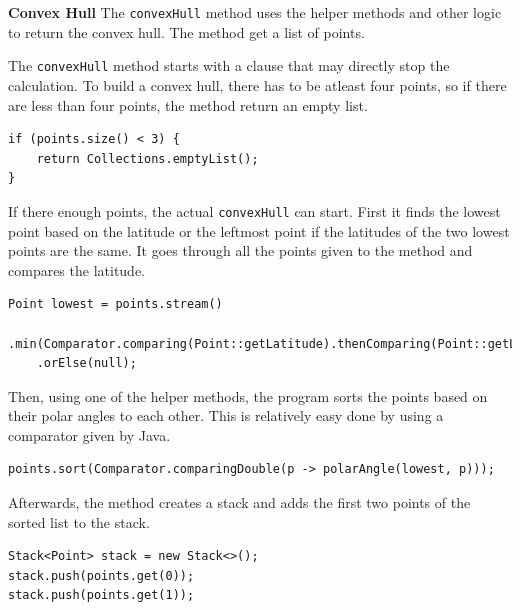     \textbf{Convex Hull}
    The \texttt{convexHull} method uses the helper methods and other logic to return the convex hull. The method get a list of points. \newline
    
    The \texttt{convexHull} method starts with a clause that may directly stop the calculation. To build a convex hull, there has to be atleast four points, so if there are less than four points, the method return an empty list.
    \lstset{style=mycsharp, caption=if Clause for Point Size}
    \begin{lstlisting}
if (points.size() < 3) {
    return Collections.emptyList();
}
    \end{lstlisting}
 
    If there enough points, the actual \texttt{convexHull} can start. First it finds the lowest point based on the latitude or the leftmost point if the latitudes of the two lowest points are the same. It goes through all the points given to the method and compares the latitude.
    \lstset{style=mycsharp, caption=Lowest Point Calculation}
    \begin{lstlisting}
Point lowest = points.stream()
    .min(Comparator.comparing(Point::getLatitude).thenComparing(Point::getLongitude))
    .orElse(null);
    \end{lstlisting}

    Then, using one of the helper methods, the program sorts the points based on their polar angles to each other. This is relatively easy done by using a comparator given by Java.

    \lstset{style=mycsharp, caption=Sort Points based on Polar Angle}
    \begin{lstlisting}
points.sort(Comparator.comparingDouble(p -> polarAngle(lowest, p)));
    \end{lstlisting}

    Afterwards, the method creates a stack and adds the first two points of the sorted list to the stack. 
    \lstset{style=mycsharp, caption=Create Stack}
    \begin{lstlisting}
Stack<Point> stack = new Stack<>();
stack.push(points.get(0));
stack.push(points.get(1));
    \end{lstlisting}

